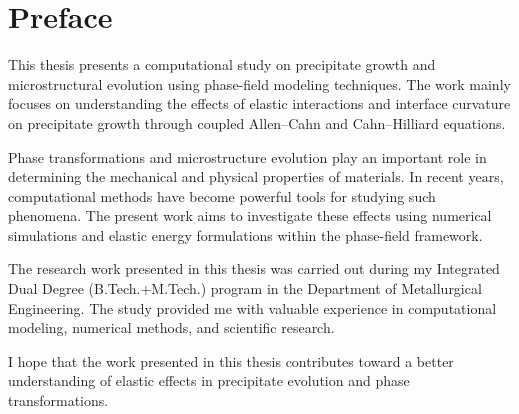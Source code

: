 \chapter*{Preface}

This thesis presents a computational study on precipitate growth and microstructural evolution using phase-field modeling techniques. The work mainly focuses on understanding the effects of elastic interactions and interface curvature on precipitate growth through coupled Allen–Cahn and Cahn–Hilliard equations.

Phase transformations and microstructure evolution play an important role in determining the mechanical and physical properties of materials. In recent years, computational methods have become powerful tools for studying such phenomena. The present work aims to investigate these effects using numerical simulations and elastic energy formulations within the phase-field framework.

The research work presented in this thesis was carried out during my Integrated Dual Degree (B.Tech.+M.Tech.) program in the Department of Metallurgical Engineering. The study provided me with valuable experience in computational modeling, numerical methods, and scientific research.

I hope that the work presented in this thesis contributes toward a better understanding of elastic effects in precipitate evolution and phase transformations.